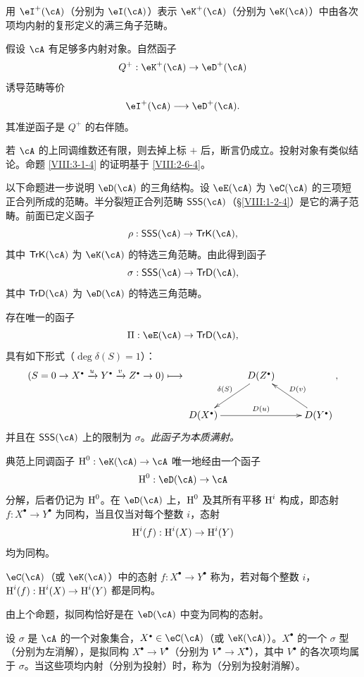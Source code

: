 用 $\eI^+(\cA)$（分别为 $\eI(\cA)$）表示 $\eK^+(\cA)$（分别为 $\eK(\cA)$）中由各次项均内射的复形定义的满三角子范畴。
\begin{proposition}\label{VIII:3-1-4}
假设 $\cA$ 有足够多内射对象。自然函子
\[Q^+:\eK^+(\cA)\to\eD^+(\cA)\]
诱导范畴等价
\[\eI^+(\cA)\longrightarrow\eD^+(\cA).\]
其准逆函子是 $Q^+$ 的右伴随。
\end{proposition}
若 $\cA$ 的上同调维数还有限，则去掉上标 $+$ 后，断言仍成立。投射对象有类似结论。命题 \ref{VIII:3-1-4} 的证明基于 \ref{VIII:2-6-4}。

以下命题进一步说明 $\eD(\cA)$ 的三角结构。设 $\eE(\cA)$ 为 $\eC(\cA)$ 的三项短正合列所成的范畴。半分裂短正合列范畴 $\mathsf{SSS}(\cA)$（\S\ref{VIII:1-2-4}）是它的满子范畴。前面已定义函子
\[\rho:\mathsf{SSS}(\cA)\to\mathsf{TrK}(\cA),\]
其中 $\mathsf{TrK}(\cA)$ 为 $\eK(\cA)$ 的特选三角范畴。由此得到函子
\[\sigma:\mathsf{SSS}(\cA)\to\mathsf{TrD}(\cA),\]
其中 $\mathsf{TrD}(\cA)$ 为 $\eD(\cA)$ 的特选三角范畴。
\begin{proposition}\label{VIII:3-1-5}
存在唯一的函子
\[\Pi:\eE(\cA)\to\mathsf{TrD}(\cA),\]
具有如下形式（$\deg\delta(S)=1$）：
\[
(S=0\to X^\bullet\xrightarrow{u}Y^\bullet\xrightarrow{v}Z^\bullet\to0)
\longmapsto
\xymatrix{&D(Z^\bullet)\ar[dl]_-{\delta(S)}\\D(X^\bullet)\ar[rr]^-{D(u)}&&D(Y^\bullet)\ar[ul]_-{D(v)}},
\]
并且在 $\mathsf{SSS}(\cA)$ 上的限制为 $\sigma$。\emph{此函子为本质满射。}
\end{proposition}
\begin{proposition}\label{VIII:3-1-6}
典范上同调函子 $\h^0:\eK(\cA)\to\cA$ 唯一地经由一个函子
\[\h^0:\eD(\cA)\to\cA\]
分解，后者仍记为 $\operatorname{H}^0$。在 $\eD(\cA)$ 上，$\operatorname{H}^0$ 及其所有平移 $\operatorname{H}^i$ 构成，即态射 $f:X^\bullet\to Y^\bullet$ 为同构，当且仅当对每个整数 $i$，态射
\[\operatorname{H}^i(f):\operatorname{H}^i(X)\to\operatorname{H}^i(Y)\]
均为同构。
\end{proposition}
\begin{definition}\label{VIII:3-1-7}
$\eC(\cA)$（或 $\eK(\cA)$）中的态射 $f:X^\bullet\to Y^\bullet$ 称为，若对每个整数 $i$，$\operatorname{H}^i(f):\operatorname{H}^i(X)\to\operatorname{H}^i(Y)$ 都是同构。
\end{definition}
由上个命题，拟同构恰好是在 $\eD(\cA)$ 中变为同构的态射。
\begin{definition}\label{VIII:3-1-8}
设 $\sigma$ 是 $\cA$ 的一个对象集合，$X^\bullet\in\eC(\cA)$（或 $\eK(\cA)$）。$X^\bullet$ 的一个 $\sigma$ 型（分别为左消解），是拟同构 $X^\bullet\to V^\bullet$（分别为 $V^\bullet\to X^\bullet$），其中 $V^\bullet$ 的各次项均属于 $\sigma$。当这些项均内射（分别为投射）时，称为（分别为投射消解）。
\end{definition}
